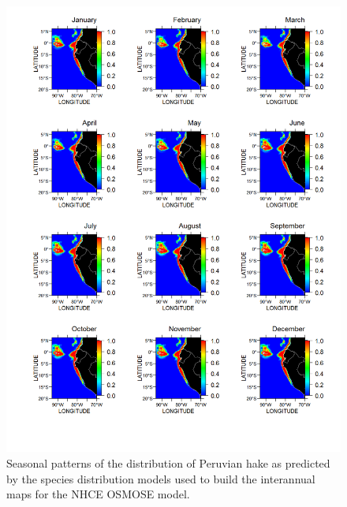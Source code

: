 \begin{figure}
\centering
\includegraphics[height=0.8\textheight]{figures/hake-climatology}
\caption[Seasonal patterns of the distribution of Peruvian hake]{Seasonal patterns of the distribution of Peruvian hake as predicted by the species distribution models used to build the interannual maps for the NHCE OSMOSE model.}
\label{fig:hake-climatology}
\end{figure}

